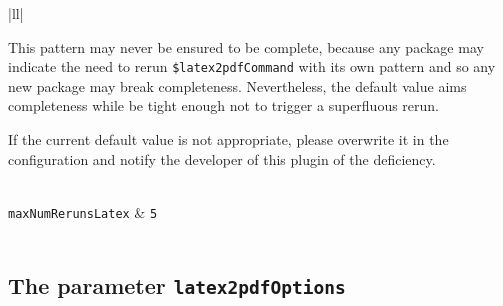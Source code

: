 \begin{longtable}{|ll|}
{\begin{minipage}{0.95\linewidth}
This pattern may never be ensured to be complete, 
because any package 
may indicate the need to rerun \texttt{\$latex2pdfCommand} 
with its own pattern and so any new package may break completeness. 
Nevertheless, the default value aims completeness 
while be tight enough not to trigger a superfluous rerun. 

If the current default value is not appropriate, 
please overwrite it in the configuration 
and notify the developer of this plugin of the deficiency. 
\end{minipage}
} \\
\texttt{maxNumRerunsLatex}        & \texttt{5}               \\
 \\
\end{longtable}


\subsection{The parameter \texttt{latex2pdfOptions}}%
\label{subsec:latex2pdfOptions}

